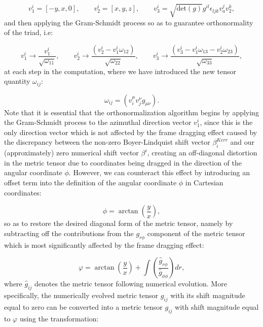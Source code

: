 \documentclass{article}
\begin{document}
\begin{equation}
v_{1}^{i} = \left[ -y, x, 0 \right], \qquad v_{2}^{i} = \left[ x, y, z \right], \qquad v_{3}^{i} = \sqrt{\mathrm{det} \left( g \right)} g^{i l} \epsilon_{l j k} v_{a}^{j} v_{2}^{k},
\end{equation}
and then applying the Gram-Schmidt process so as to guarantee orthonormality of the triad, i.e:

\begin{equation}
v_{1}^{i} \to \frac{v_{1}^{i}}{\sqrt{\omega_{1 1}}}, \qquad v_{2}^{i} \to \frac{\left( v_{2}^{i} - v_{1}^{i} \omega_{1 2} \right)}{\sqrt{\omega_{2 2}}}, \qquad v_{3}^{i} \to \frac{\left( v_{3}^{i} - v_{1}^{i} \omega_{1 3} - v_{2}^{i} \omega_{2 3} \right)}{\sqrt{\omega_{3 3}}},
\end{equation}
at each step in the computation, where we have introduced the new tensor quantity ${\omega_{i j}}$:

\begin{equation}
\omega_{i j} = \left( v_{i}^{\mu} v_{j}^{\nu} g_{\mu \nu} \right).
\end{equation}
Note that it is essential that the orthonormalization algorithm begins by applying the Gram-Schmidt process to the azimuthal direction vector ${v_{1}^{i}}$, since this is the only direction vector which is not affected by the frame dragging effect caused by the discrepancy between the non-zero Boyer-Lindquist shift vector ${\beta_{i}^{Kerr}}$ and our (approximately) zero numerical shift vector ${\beta^i}$, creating an off-diagonal distortion in the metric tensor due to coordinates being dragged in the direction of the angular coordinate ${\phi}$. However, we can counteract this effect by introducing an offset term into the definition of the angular coordinate ${\phi}$ in Cartesian coordinates:

\begin{equation}
\phi = \arctan \left( \frac{y}{x} \right),
\end{equation}
so as to restore the desired diagonal form of the metric tensor, namely by subtracting off the contributions from the ${g_{r \phi}}$ component of the metric tensor which is most significantly affected by the frame dragging effect:

\begin{equation}
\varphi = \arctan \left( \frac{y}{x} \right) + \int \left( \frac{\hat{g}_{r \phi}}{\hat{g}_{\phi \phi}} \right) dr,
\end{equation}
where ${\hat{g}_{i j}}$ denotes the metric tensor following numerical evolution. More specifically, the numerically evolved metric tensor ${\hat{g}_{i j}}$ with its shift magnitude equal to zero can be converted into a metric tensor ${g_{i j}}$ with shift magnitude equal to ${\varphi}$ using the transformation:
\end{document}
